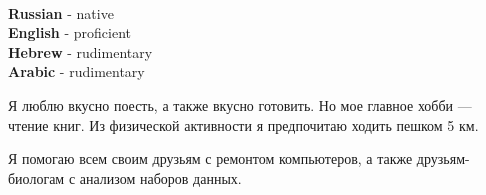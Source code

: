 \documentclass[9pt]{developercv} %
\begin{document}

\begin{minipage}[t]{0.3\textwidth}
	\vspace{-\baselineskip} %

  \\
	\textbf{Russian} - native\\
	\textbf{English} - proficient\\
	\textbf{Hebrew} - rudimentary\\
	\textbf{Arabic} - rudimentary\\
\end{minipage}
\hfill
\begin{minipage}[t]{0.3\textwidth}
	\vspace{-\baselineskip} %
	
	
  Я люблю вкусно поесть, а также вкусно готовить. Но мое главное хобби — чтение книг. 
  Из физической активности я предпочитаю ходить пешком 5 км.
\end{minipage}
\hfill
\begin{minipage}[t]{0.3\textwidth}
	\vspace{-\baselineskip} %
	

Я помогаю всем своим друзьям с ремонтом компьютеров, а также друзьям-биологам с анализом наборов данных.
\end{minipage}

\end{document}
